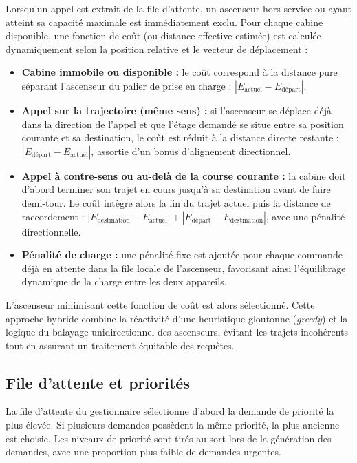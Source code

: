 \documentclass[11pt,a4paper]{article}
\begin{document}
Lorsqu'un appel est extrait de la file d'attente, un ascenseur hors service ou ayant atteint sa capacité maximale est immédiatement exclu. Pour chaque cabine disponible, une fonction de coût (ou distance effective estimée) est calculée dynamiquement selon la position relative et le vecteur de déplacement :
\begin{itemize}
  \item \textbf{Cabine immobile ou disponible :} le coût correspond à la distance pure séparant l'ascenseur du palier de prise en charge : $|E_{\text{actuel}} - E_{\text{départ}}|$.
  \item \textbf{Appel sur la trajectoire (même sens) :} si l'ascenseur se déplace déjà dans la direction de l'appel et que l'étage demandé se situe entre sa position courante et sa destination, le coût est réduit à la distance directe restante : $|E_{\text{départ}} - E_{\text{actuel}}|$, assortie d'un bonus d'alignement directionnel.
  \item \textbf{Appel à contre-sens ou au-delà de la course courante :} la cabine doit d'abord terminer son trajet en cours jusqu'à sa destination avant de faire demi-tour. Le coût intègre alors la fin du trajet actuel puis la distance de raccordement : $|E_{\text{destination}} - E_{\text{actuel}}| + |E_{\text{départ}} - E_{\text{destination}}|$, avec une pénalité directionnelle.
  \item \textbf{Pénalité de charge :} une pénalité fixe est ajoutée pour chaque commande déjà en attente dans la file locale de l'ascenseur, favorisant ainsi l'équilibrage dynamique de la charge entre les deux appareils.
\end{itemize}

L'ascenseur minimisant cette fonction de coût est alors sélectionné. Cette approche hybride combine la réactivité d'une heuristique gloutonne (\textit{greedy}) et la logique du balayage unidirectionnel des ascenseurs, évitant les trajets incohérents tout en assurant un traitement équitable des requêtes.

\subsection{File d'attente et priorités}

La file d'attente du gestionnaire sélectionne d'abord la demande de priorité la plus élevée. Si plusieurs demandes possèdent la même priorité, la plus ancienne est choisie. Les niveaux de priorité sont tirés au sort lors de la génération des demandes, avec une proportion plus faible de demandes urgentes.
\end{document}
